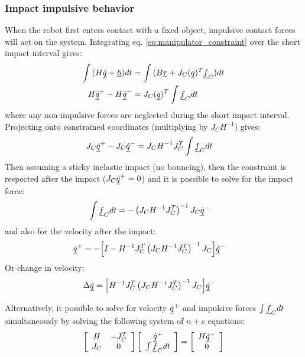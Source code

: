 {\subsubsection{Impact impulsive behavior}
\label{sec:impact}
%
When the robot first enters contact with a fixed object, impulsive contact forces will act on the system. Integrating eq. \eqref{eq:manipulator_constraint} over the short impact interval gives:
%
\begin{align}
\int{ ( H \underline{\ddot{q}} + \underline{h} ) dt } &= \int{ ( B \underline{\tau} + J_C( \underline{ q } )^T  \underline{f}_C ) dt } \\
H \underline{\dot{q}}^+ - H \underline{\dot{q}}^- &= J_C( \underline{ q } )^T  \int{  \underline{f}_C dt }
\label{eq:manipulator_impact}
\end{align}
%
where any non-impulsive forces are neglected during the short impact interval. Projecting onto constrained coordinates (multiplying by $J_C H^{-1}$) gives:
%
\begin{align}
J_C \underline{\dot{q}}^+ - J_C \underline{\dot{q}}^- &= J_C H^{-1} J_C^T  \int{  \underline{f}_C dt }
\label{eq:manipulator_impact2}
\end{align}
%
Then assuming a sticky inelastic impact (no bouncing), then the constraint is respected after the impact ($J_C \underline{\dot{q}}^+=0$) and it is possible to solve for the impact force:
%
\begin{align}
\int{  \underline{f}_C dt } &= - \left( J_C H^{-1} J_C^T \right)^{-1}  J_C \underline{\dot{q}}^-
\label{eq:manipulator_impact_force}
\end{align}
%
and also for the velocity after the impact:
%
\begin{align}
\underline{\dot{q}}^+ &= - \Big[ I - H^{-1} J_C^T \left( J_C H^{-1} J_C^T \right)^{-1} J_C \Big] \underline{\dot{q}}^-
\label{eq:manipulator_impact_velocity}
\end{align}
%
Or change in velocity:
%
\begin{align}
\Delta \underline{\dot{q}} &=  \Big[ H^{-1} J_C^T \left( J_C H^{-1} J_C^T \right)^{-1} J_C \Big] \underline{\dot{q}}^-
\label{eq:manipulator_impact_velocity_delta}
\end{align}
%

Alternatively, it possible to solve for velocity $\underline{\dot{q}}^+$ and impulsive forces $\int{ \underline{f}_C dt }$ simultaneously by solving the following system of $n+c$ equations:
%
\begin{align}
\left[ \begin{array}{c c } 	H & -J_C^T  \\ J_C 	& 0  	\end{array} \right] \left[ \begin{array}{c} \underline{\dot{q}}^+  \\ \int{ \underline{f}_C dt }\end{array} \right] = \left[ \begin{array}{c}  	H \underline{\dot{q}}^-   \\ 0  \end{array} \right]
\label{eq:manipulator_impact_eom}
\end{align}


}
